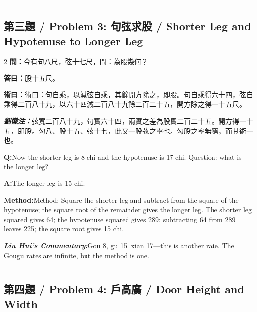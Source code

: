 \documentclass[11pt,a4paper]{article}
\newcommand{\cnwen}{\textcolor{cnlabelfg}{\textbf{問：}}}
\newcommand{\cnda}{\textbf{答曰：}}
\newcommand{\cnshu}{\textcolor{cnlabelfg}{\textbf{術曰：}}}
\newcommand{\cnzhu}{\textcolor{commentarycolor}{\textit{\textbf{劉徽注：}}}}
\newcommand{\enwen}{\textcolor{enlabelfg}{\textbf{Q:}}}
\newcommand{\enda}{\textcolor{enlabelfg}{\textbf{A:}}}
\newcommand{\enshu}{\textcolor{enlabelfg}{\textbf{Method:}}}
\newcommand{\enzhu}{\textcolor{enlabelfg}{\textit{\textbf{Liu Hui's Commentary:}}}}
\begin{document}
\bigskip\hrule\bigskip

\subsection{第三題 / Problem 3: 句弦求股 / Shorter Leg and Hypotenuse to Longer Leg}

\begin{paracol}{2}
\switchcolumn[0]
\cnwen 今有句八尺，弦十七尺，問：為股幾何？

\cnda 股十五尺。

\cnshu 術曰：句自乘，以減弦自乘，其餘開方除之，即股。句自乘得六十四，弦自乘得二百八十九，以六十四減二百八十九餘二百二十五，開方除之得一十五尺。

\cnzhu 弦寬二百八十九，句實六十四，兩實之差為股實二百二十五。開方得一十五，即股。勾八、股十五、弦十七，此又一股弦之率也。勾股之率無窮，而其術一也。

\switchcolumn[1]
\enwen Now the shorter leg is 8 chi and the hypotenuse is 17 chi. Question: what is the longer leg?

\enda The longer leg is 15 chi.

\enshu Method: Square the shorter leg and subtract from the square of the hypotenuse; the square root of the remainder gives the longer leg. The shorter leg squared gives 64; the hypotenuse squared gives 289; subtracting 64 from 289 leaves 225; the square root gives 15 chi.

\enzhu Gou 8, gu 15, xian 17---this is another rate. The Gougu rates are infinite, but the method is one.
\end{paracol}

\bigskip\hrule\bigskip

\subsection{第四題 / Problem 4: 戶高廣 / Door Height and Width}
\end{document}

